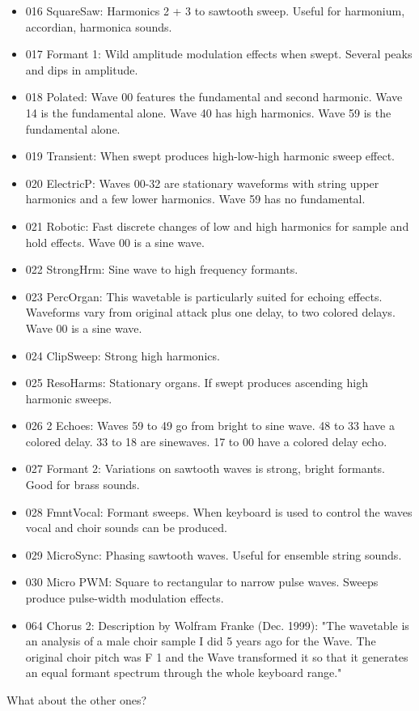 \begin{itemize}
	\item 016 SquareSaw: Harmonics 2 + 3 to sawtooth sweep. Useful for harmonium, accordian, harmonica sounds.
	\item 017 Formant 1: Wild amplitude modulation effects when swept. Several peaks and dips in amplitude.
	\item 018 Polated: Wave 00 features the fundamental and second harmonic. Wave 14 is the fundamental alone. Wave 40 has high harmonics. Wave 59 is the fundamental alone.
	\item 019 Transient: When swept produces high-low-high harmonic sweep effect.
	\item 020 ElectricP: Waves 00-32 are stationary waveforms with string upper harmonics and a few lower harmonics. Wave 59 has no fundamental.
	\item 021 Robotic: Fast discrete changes of low and high harmonics for sample and hold effects. Wave 00 is a sine wave.
	\item 022 StrongHrm: Sine wave to high frequency formants.
	\item 023 PercOrgan: This wavetable is particularly suited for echoing effects. Waveforms vary from original attack plus one delay, to two colored delays. Wave 00 is a sine wave.
	\item 024 ClipSweep: Strong high harmonics.
	\item 025 ResoHarms: Stationary organs. If swept produces ascending high harmonic sweeps.
	\item 026 2 Echoes:	Waves 59 to 49 go from bright to sine wave. 48 to 33 have a colored delay. 33 to 18 are sinewaves. 17 to 00 have a colored delay echo.
	\item 027 Formant 2: Variations on sawtooth waves is strong, bright formants. Good for brass sounds.
	\item 028 FmntVocal: Formant sweeps. When keyboard is used to control the waves vocal and choir sounds can be produced.
	\item 029 MicroSync: Phasing sawtooth waves. Useful for ensemble string sounds.
	\item 030 Micro PWM: Square to rectangular to narrow pulse waves. Sweeps produce pulse-width modulation effects.
	\item 064 Chorus 2: Description by Wolfram Franke (Dec. 1999): "The wavetable is an analysis of a
	male choir sample I did 5 years ago for the Wave. The original choir pitch
	was F 1 and the Wave transformed it so that it generates an equal formant
	spectrum through the whole keyboard range."
\end{itemize}
What about the other ones?